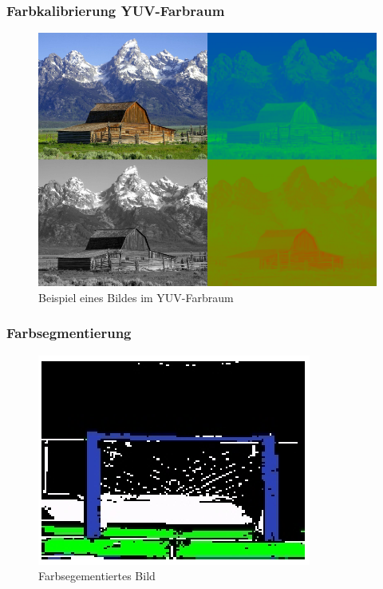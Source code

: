 \documentclass[a4paper,12pt]{article}
\begin{document}
\subsubsection{Farbkalibrierung YUV-Farbraum}
\begin{figure}[H]
\includegraphics[scale=0.5]{Barn-yuv.png}
\caption{Beispiel eines Bildes im YUV-Farbraum}
\label{fig:yuv}
\end{figure}

\subsubsection{Farbsegmentierung}

\begin{figure}[H]
\includegraphics{segmented-view2.png}
\caption{Farbsegementiertes Bild}
\label{fig:color-seg}
\end{figure}
\end{document}
